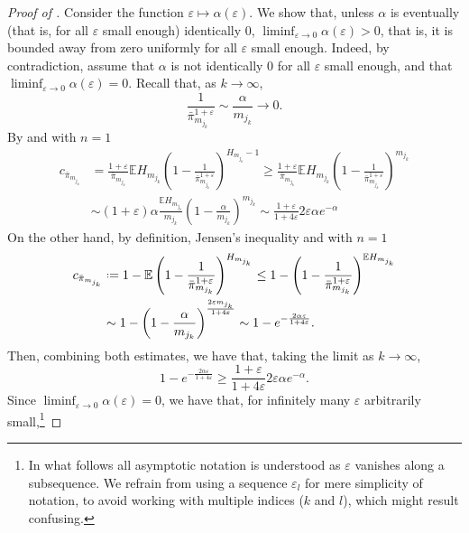 \documentclass[11pt, a4paper, twoside]{article}
\newcommand*{\defeq}{\mathrel{\vcenter{\baselineskip0.5ex \lineskiplimit0pt
			\hbox{\scriptsize.}\hbox{\scriptsize.}}}=}
\newcommand{\eps}{\varepsilon}
\newcommand{\EE}{\mathbb{E}}
\numberwithin{equation}{section}
\begin{document}
\begin{proof}[Proof of ]
            Consider the function $\eps \mapsto \alpha(\eps)$. 
            We show that, unless $\alpha$ is eventually (that is, for all $\eps$ small enough) identically $0$, $\liminf_{\eps \to 0} \alpha(\eps) > 0$, that is, it is bounded away from zero uniformly for all $\eps$ small enough. 
            Indeed, by contradiction, assume that $\alpha$ is not identically $0$ for all $\eps$ small enough, and that $\liminf_{\eps \to 0} \alpha(\eps) = 0$. 
            Recall that, as $k\longrightarrow\infty$,
    		\begin{equation}\label{asymp_pi}
    			\frac{1}{\bar{\pi}_{m_{j_k}}^{1+\eps}}\sim\frac{\alpha}{m_{j_k}}\longrightarrow 0.
    		\end{equation} 
    		By  and  with $n=1$ 
    		\begin{align*}
    			c_{\bar{\pi}_{m_{j_k}}}&=\frac{1+\eps}{\bar{\pi}_{m_{j_k}}}\EE H_{m_{j_k}}\left(1-\frac{1}{\bar{\pi}_{m_{j_k}}^{1+\eps}}\right)^{H_{m_{j_k}}-1}\ge \frac{1+\eps}{\bar{\pi}_{m_{j_k}}}\EE H_{m_{j_k}}\left(1-\frac{1}{\bar{\pi}_{m_{j_k}}^{1+\eps}}\right)^{m_{j_k}}\\&\sim (1+\eps) \alpha\frac{\EE H_{m_{j_k}}}{m_{j_k}}\left(1-\frac{\alpha}{m_{j_k}}\right)^{m_{j_k}}\sim\frac{1+\eps}{1+4\eps}2\eps\alpha e^{-\alpha}
    		\end{align*}
    		On the other hand, by definition, Jensen's inequality  and  with $n=1$
    		\begin{align*}
    			c_{\bar{\pi}_{m_{j_k}}}&\defeq 1-\EE \left(1-\frac{1}{\bar{\pi}_{m_{j_k}}^{1+\eps}}\right)^{H_{m_{j_k}}}\le 1- \left(1-\frac{1}{\bar{\pi}_{m_{j_k}}^{1+\eps}}\right)^{\EE H_{m_{j_k}}}\\&\sim 1-\left(1-\frac{\alpha}{m_{j_k}}\right)^{\frac{2\eps m_{j_k}}{1+4\eps}}\sim1-e^{-\frac{2\alpha\eps}{1+4\eps}}.
    		\end{align*}
            Then, combining both estimates, we have that, taking the limit as $k\longrightarrow\infty$,
    		\begin{equation}\label{boundedalpha}
    			1-e^{-\frac{2\alpha\eps}{1+4\eps}}
                    \ge\frac{1+\eps}{1+4\eps}2\eps\alpha e^{-\alpha}.
    		\end{equation}
    		Since $\liminf_{\eps \to 0} \alpha(\eps) = 0$, we have that, for infinitely many $\eps$ arbitrarily small,\footnote{In what follows all asymptotic notation is understood as $\eps$ vanishes along a subsequence. We refrain from using a sequence $\eps_l$ for mere simplicity of notation, to avoid working with multiple indices ($k$ and $l$), which might result confusing.}

\end{proof}
\end{document}

